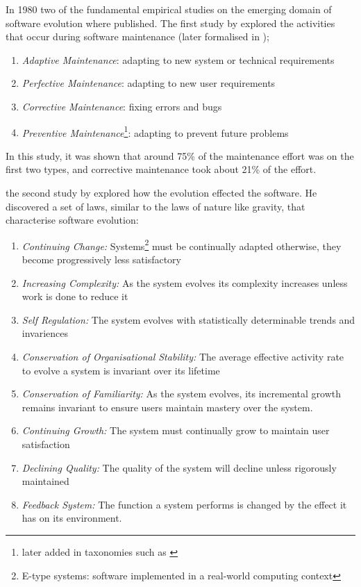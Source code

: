 In 1980 two of the fundamental empirical studies on the emerging domain of software evolution where published.
The first study by \cite{Lientz1980} explored the activities that occur during software maintenance (later formalised in \citep{IsoIec2006});
\begin{enumerate}
	\item \textit{Adaptive Maintenance}: adapting to new system or technical requirements
	\item \textit{Perfective Maintenance}: adapting to new user requirements
	\item \textit{Corrective Maintenance}: fixing errors and bugs
	\item \textit{Preventive Maintenance}\footnote{later added in taxonomies such as \citep{iee1990ieee}}: adapting to prevent future problems
\end{enumerate} 

In this study, it was shown that around 75\% of the maintenance effort was on the first two types, and corrective maintenance took about 21\% of the effort.

the second study by \cite{lehman1980} explored how the evolution effected the software.
He discovered a set of laws, similar to the laws of nature like gravity, that characterise software evolution:
\begin{enumerate}
  \item \textit{Continuing Change:} Systems\footnote{E-type systems: software implemented in a real-world computing context} must be continually adapted 
  otherwise, they become progressively less satisfactory
  \item \textit{Increasing Complexity:} As the system evolves its complexity increases unless work is done to reduce it
  \item \textit{Self Regulation:} The system evolves with statistically determinable trends and invariences
  \item \textit{Conservation of Organisational Stability:} The average effective activity rate to evolve a system is invariant over its lifetime
  \item \textit{Conservation of Familiarity:} As the system evolves, its incremental growth remains invariant to ensure users maintain mastery over the system.
  \item \textit{Continuing Growth:} The system must continually grow to maintain user satisfaction
  \item \textit{Declining Quality:} The quality of the system will decline unless rigorously maintained
  \item \textit{Feedback System:} The function a system performs is changed by the effect it has on its environment.
\end{enumerate}

